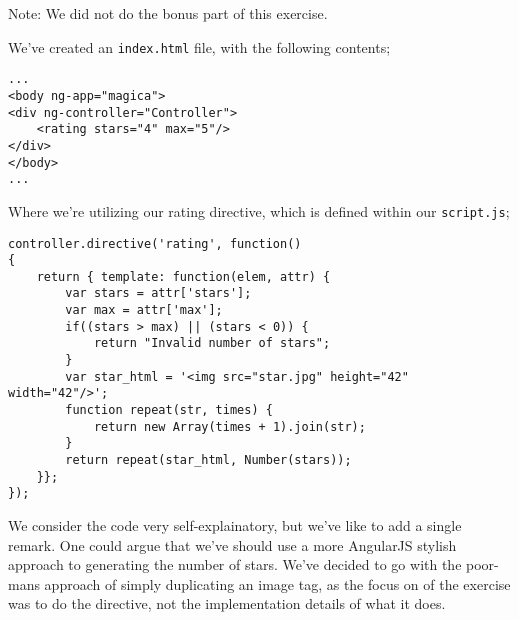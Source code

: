 Note: We did not do the bonus part of this exercise.

We've created an \verb|index.html| file, with the following contents;
\begin{verbatim}
...
<body ng-app="magica">
<div ng-controller="Controller">
    <rating stars="4" max="5"/>
</div>
</body>
...
\end{verbatim}
Where we're utilizing our rating directive, which is defined within our \verb|script.js|;
\begin{verbatim}
controller.directive('rating', function()
{
    return { template: function(elem, attr) {
        var stars = attr['stars'];
        var max = attr['max'];
        if((stars > max) || (stars < 0)) {
            return "Invalid number of stars";
        }
        var star_html = '<img src="star.jpg" height="42" width="42"/>';
        function repeat(str, times) {
            return new Array(times + 1).join(str);
        }
        return repeat(star_html, Number(stars));
    }};
});
\end{verbatim}
We consider the code very self-explainatory, but we've like to add a single remark.
One could argue that we've should use a more AngularJS stylish approach to generating the number of stars.
We've decided to go with the poor-mans approach of simply duplicating an image tag,
as the focus on of the exercise was to do the directive, not the implementation details of what it does.
